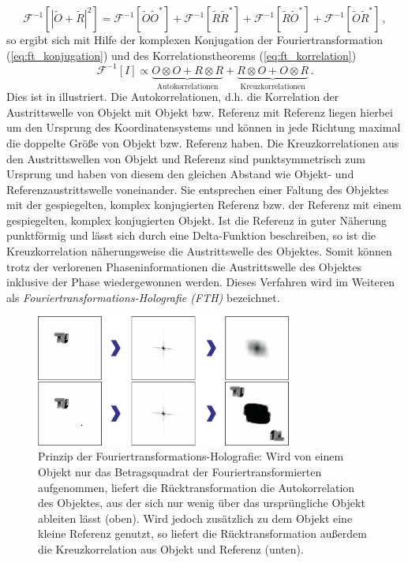 \begin{equation}
	\mathscr{F}^{-1}\left[\left|\tilde{O}+\tilde{R}\right|^2\right]=
	\mathscr{F}^{-1}\left[\tilde{O}\tilde{O}^*\right]+
	\mathscr{F}^{-1}\left[\tilde{R}\tilde{R}^*\right]+
	\mathscr{F}^{-1}\left[\tilde{R}\tilde{O}^*\right]+
	\mathscr{F}^{-1}\left[\tilde{O}\tilde{R}^*\right]\,,
\end{equation}
so ergibt sich mit Hilfe der komplexen Konjugation der Fouriertransformation (\ref{eq:ft_konjugation}) und des Korrelationstheorems (\ref{eq:ft_korrelation})
\begin{equation}
	\mathscr{F}^{-1}[I]\propto \underbrace{O \otimes O + R\otimes R}_{\text{Autokorrelationen}}+\underbrace{R\otimes O+ O\otimes R}_{\text {Kreuzkorrelationen}}\,.
\end{equation}
Dies ist in  illustriert. Die Autokorrelationen, d.h. die Korrelation der Austrittswelle von Objekt mit Objekt bzw. Referenz mit Referenz liegen hierbei um den Ursprung des Koordinatensystems und können in jede Richtung maximal die doppelte Größe von Objekt bzw. Referenz haben. Die Kreuzkorrelationen aus den Austrittswellen von Objekt und Referenz sind punktsymmetrisch zum Ursprung und haben von diesem den gleichen Abstand wie Objekt- und Referenzaustrittswelle voneinander.
Sie  entsprechen einer Faltung des Objektes mit der gespiegelten, komplex konjugierten Referenz bzw. der Referenz mit einem gespiegelten, komplex konjugierten Objekt. Ist die Referenz in guter Näherung punktförmig und lässt sich durch eine Delta-Funktion beschreiben, so ist die Kreuzkorrelation näherungsweise die Austrittswelle des Objektes. Somit können trotz der verlorenen Phaseninformationen die Austrittswelle des Objektes inklusive der Phase wiedergewonnen werden. Dieses Verfahren wird im Weiteren als \textit{Fouriertransformations-Holografie (FTH)} bezeichnet.

\begin{figure}
	\centering
	\includegraphics[width=0.75\textwidth]{images/fth.pdf}
	\caption[Prinzip Fouriertransformations-Holografie]{Prinzip der Fouriertransformations-Holografie: Wird von einem Objekt nur das Betragsquadrat der Fouriertransformierten aufgenommen, liefert die Rücktransformation die Autokorrelation des Objektes, aus der sich nur wenig über das ursprüngliche Objekt ableiten lässt (oben). Wird jedoch zusätzlich zu dem Objekt eine kleine Referenz genutzt, so liefert die Rücktransformation außerdem die Kreuzkorrelation aus Objekt und Referenz (unten).}
	\label{fig:fth}
\end{figure}

